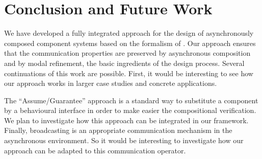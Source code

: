 

















\section{Conclusion and Future Work}\label{sec:conclusion-tgc}
We have developed a fully integrated approach for the design
of asynchronously composed component systems based on the formalism of \MAIOPNs.
Our approach
ensures that the communication properties are preserved
by asynchronous composition and by  modal refinement, the basic ingredients of the design process.
Several continuations of this work are possible. First, it would be interesting to
see how our approach works in larger case studies and concrete applications.

The ``Assume/Guarantee'' approach is a standard way to substitute a component by a behavioural interface 
in order to make easier the compositional verification. We plan to investigate
how this approach can be integrated in our framework.
Finally, broadcasting
is an appropriate communication mechanism in the asynchronous environment.
So it would be interesting to investigate how our approach can be adapted
to this communication operator. 